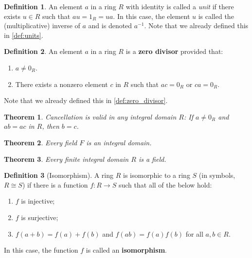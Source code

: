 \documentclass{article}
\newtheorem{theorem}{Theorem}[section]
\theoremstyle{definition}
\newtheorem{definition}{Definition}[section]
\theoremstyle{remark}
\begin{document}
\begin{definition}\label{def:units p2}
An element $a$ in a ring $R$ with identity is called a \textit{unit} if there exists $u \in R$ such that $au = 1_R = ua$. In this case, 
the element $u$ is called the (multiplicative) inverse of $a$ and is
denoted $a^{-1}$. Note that we already defined this in \ref{def:units}.
\end{definition}







\begin{definition}\label{def:zero divisor p2}
An element $a$ in a ring $R$ is a \textbf{zero divisor} provided that:
\begin{enumerate}
\item $a \neq 0_R$.
\item There exists a nonzero element $c$ in $R$ such that $ac = 0_R$ or $ca = 0_R$.
\end{enumerate}
Note that we already defined this in \ref{def:zero_divisor}.
\end{definition}




\begin{theorem}\label{thm:cancellation of Multiplication}
Cancellation is valid in any integral domain $R$: If $a \neq 0_R$ and $ab = ac$ in $R$, then $b = c$.
\end{theorem}




\begin{theorem}\label{thm:fields are integral domains}
Every field $F$ is an integral domain.
\end{theorem}




\begin{theorem}\label{thm:finite integral domain is field}
Every finite integral domain $R$ is a field.
\end{theorem}





\begin{definition}[Isomorphism]
A ring $R$ is isomorphic to a ring $S$ (in symbols, $R \cong S$) if there is a function $f: R \to S$ such that all of the below hold:
\begin{enumerate}
\item $f$ is injective;
\item $f$ is surjective;
\item $f(a + b) = f(a) + f(b)$ \quad and \quad $f(ab) = f(a) f(b)$ for all $a, b \in R$.
\end{enumerate}
In this case, the function $f$ is called an \textbf{isomorphism}.
\end{definition}
\end{document}
